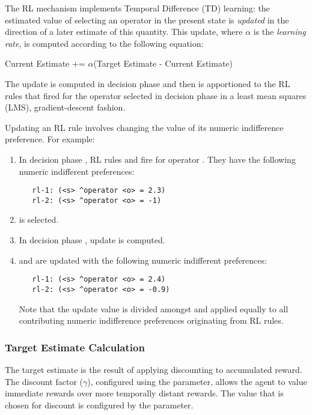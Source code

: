 The RL mechanism implements Temporal Difference (TD) learning: the estimated value of selecting an operator in the present state is \emph{updated} in the direction of a later estimate of this quantity.  This update, where $\alpha$ is the \emph{learning rate}, is computed according to the following equation:

\begin{center}
Current Estimate += $\alpha$(Target Estimate - Current Estimate)
\end{center}

The update is computed in decision phase  and then is apportioned to the RL rules that fired for the operator selected in decision phase  in a least mean squares (LMS), gradient-descent fashion.

Updating an RL rule involves changing the value of its numeric indifference preference.  For example:

\begin{enumerate}

\item In decision phase , RL rules  and  fire for operator . They have the following numeric indifferent preferences:
\begin{verbatim}
   rl-1: (<s> ^operator <o> = 2.3)
   rl-2: (<s> ^operator <o> = -1)
\end{verbatim}  

\item {} is selected.

\item In decision phase , update  is computed.

\item {} and  are updated with the following numeric indifferent preferences:
\begin{verbatim}
   rl-1: (<s> ^operator <o> = 2.4)
   rl-2: (<s> ^operator <o> = -0.9)
\end{verbatim}

Note that the update value is divided amongst and applied equally to all contributing numeric indifference preferences originating from RL rules.

\end{enumerate}

\subsubsection{Target Estimate Calculation}
The target estimate is the result of applying discounting to accumulated reward.  The discount factor ($\gamma$), configured using the  parameter, allows the agent to value immediate rewards over more temporally distant rewards.  The value that is chosen for discount is configured by the  parameter.

